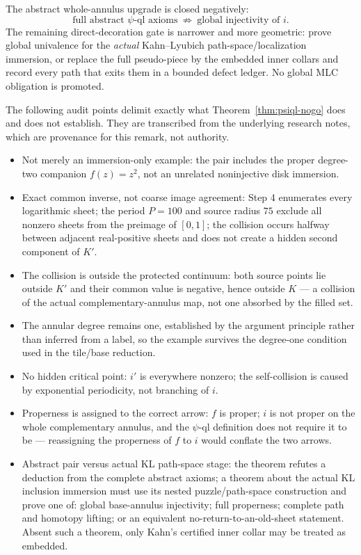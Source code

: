 \begin{remark}\label{rem:psiql-gate}
The abstract whole-annulus upgrade is closed negatively:
\[ \boxed{\ \text{full abstract \(\psi\)-ql axioms}\ \not\Longrightarrow\ \text{global injectivity of } i.\ } \]
The remaining direct-decoration gate is narrower and more geometric: prove global univalence for the \emph{actual} Kahn--Lyubich path-space/localization immersion, or replace the full pseudo-piece by the embedded inner collars and record every path that exits them in a bounded defect ledger. No global MLC obligation is promoted.
\end{remark}

\begin{remark}\label{rem:psiql-audit}
The following audit points delimit exactly what
Theorem~\ref{thm:psiql-nogo} does and does not establish.  They are
transcribed from the underlying research notes, which are provenance
for this remark, not authority.
\begin{itemize}
\item Not merely an immersion-only example: the pair includes the proper degree-two companion \(f(z)=z^2\), not an unrelated noninjective disk immersion.
\item Exact common inverse, not coarse image agreement: Step 4 enumerates every logarithmic sheet; the period \(P=100\) and source radius \(75\) exclude all nonzero sheets from the preimage of \([0,1]\); the collision occurs halfway between adjacent real-positive sheets and does not create a hidden second component of \(K'\).
\item The collision is outside the protected continuum: both source points lie outside \(K'\) and their common value is negative, hence outside \(K\) --- a collision of the actual complementary-annulus map, not one absorbed by the filled set.
\item The annular degree remains one, established by the argument principle rather than inferred from a label, so the example survives the degree-one condition used in the tile/base reduction.
\item No hidden critical point: \(i'\) is everywhere nonzero; the self-collision is caused by exponential periodicity, not branching of \(i\).
\item Properness is assigned to the correct arrow: \(f\) is proper; \(i\) is not proper on the whole complementary annulus, and the \(\psi\)-ql definition does not require it to be --- reassigning the properness of \(f\) to \(i\) would conflate the two arrows.
\item Abstract pair versus actual KL path-space stage: the theorem refutes a deduction from the complete abstract axioms; a theorem about the actual KL inclusion immersion must use its nested puzzle/path-space construction and prove one of: global base-annulus injectivity; full properness; complete path and homotopy lifting; or an equivalent no-return-to-an-old-sheet statement.  Absent such a theorem, only Kahn's certified inner collar may be treated as embedded.
\end{itemize}
\end{remark}